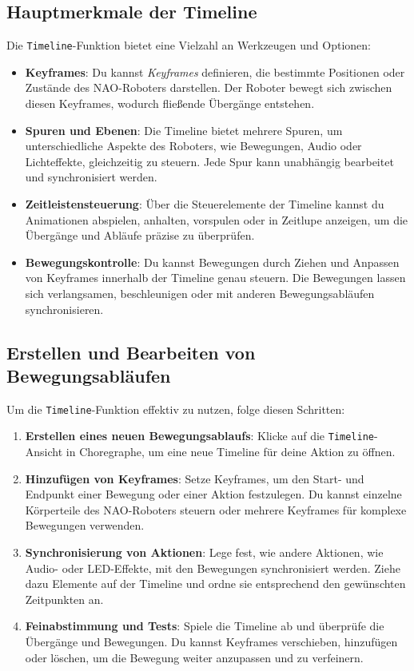 \subsection{Hauptmerkmale der Timeline}
Die \texttt{Timeline}-Funktion bietet eine Vielzahl an Werkzeugen und Optionen:
\begin{itemize}
    \item \textbf{Keyframes}: Du kannst \textit{Keyframes} definieren, die bestimmte Positionen oder Zustände des NAO-Roboters darstellen. Der Roboter bewegt sich zwischen diesen Keyframes, wodurch fließende Übergänge entstehen.
    \item \textbf{Spuren und Ebenen}: Die Timeline bietet mehrere Spuren, um unterschiedliche Aspekte des Roboters, wie Bewegungen, Audio oder Lichteffekte, gleichzeitig zu steuern. Jede Spur kann unabhängig bearbeitet und synchronisiert werden.
    \item \textbf{Zeitleistensteuerung}: Über die Steuerelemente der Timeline kannst du Animationen abspielen, anhalten, vorspulen oder in Zeitlupe anzeigen, um die Übergänge und Abläufe präzise zu überprüfen.
    \item \textbf{Bewegungskontrolle}: Du kannst Bewegungen durch Ziehen und Anpassen von Keyframes innerhalb der Timeline genau steuern. Die Bewegungen lassen sich verlangsamen, beschleunigen oder mit anderen Bewegungsabläufen synchronisieren.
\end{itemize}

\subsection{Erstellen und Bearbeiten von Bewegungsabläufen}
Um die \texttt{Timeline}-Funktion effektiv zu nutzen, folge diesen Schritten:
\begin{enumerate}
    \item \textbf{Erstellen eines neuen Bewegungsablaufs}: Klicke auf die \texttt{Timeline}-Ansicht in Choregraphe, um eine neue Timeline für deine Aktion zu öffnen.
    \item \textbf{Hinzufügen von Keyframes}: Setze Keyframes, um den Start- und Endpunkt einer Bewegung oder einer Aktion festzulegen. Du kannst einzelne Körperteile des NAO-Roboters steuern oder mehrere Keyframes für komplexe Bewegungen verwenden.
    \item \textbf{Synchronisierung von Aktionen}: Lege fest, wie andere Aktionen, wie Audio- oder LED-Effekte, mit den Bewegungen synchronisiert werden. Ziehe dazu Elemente auf der Timeline und ordne sie entsprechend den gewünschten Zeitpunkten an.
    \item \textbf{Feinabstimmung und Tests}: Spiele die Timeline ab und überprüfe die Übergänge und Bewegungen. Du kannst Keyframes verschieben, hinzufügen oder löschen, um die Bewegung weiter anzupassen und zu verfeinern.
\end{enumerate}

